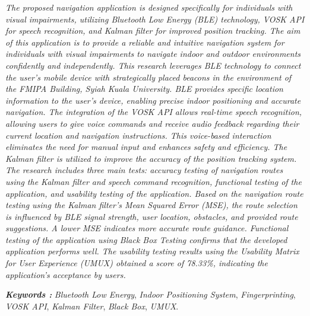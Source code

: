\begin{abstracteng}
\noindent \textit{The proposed navigation application is designed specifically for individuals with visual impairments, utilizing Bluetooth Low Energy (BLE) technology, VOSK API for speech recognition, and Kalman filter for improved position tracking. The aim of this application is to provide a reliable and intuitive navigation system for individuals with visual impairments to navigate indoor and outdoor environments confidently and independently. This research leverages BLE technology to connect the user's mobile device with strategically placed beacons in the environment of the FMIPA Building, Syiah Kuala University. BLE provides specific location information to the user's device, enabling precise indoor positioning and accurate navigation. The integration of the VOSK API allows real-time speech recognition, allowing users to give voice commands and receive audio feedback regarding their current location and navigation instructions. This voice-based interaction eliminates the need for manual input and enhances safety and efficiency. The Kalman filter is utilized to improve the accuracy of the position tracking system. The research includes three main tests: accuracy testing of navigation routes using the Kalman filter and speech command recognition, functional testing of the application, and usability testing of the application. Based on the navigation route testing using the Kalman filter's Mean Squared Error (MSE), the route selection is influenced by BLE signal strength, user location, obstacles, and provided route suggestions. A lower MSE indicates more accurate route guidance. Functional testing of the application using Black Box Testing confirms that the developed application performs well. The usability testing results using the Usability Matrix for User Experience (UMUX) obtained a score of 78.33\%, indicating the application's acceptance by users.}






\bigskip
\noindent
\textbf{\emph{Keywords :}} \textit{Bluetooth Low Energy}, \textit{Indoor Positioning System}, \textit{Fingerprinting}, \textit{VOSK API}, \textit{Kalman Filter}, \textit{Black Box}, \textit{UMUX}.
\end{abstracteng}